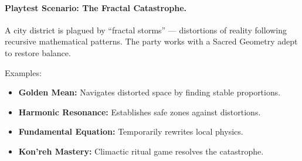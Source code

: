 \paragraph{Playtest Scenario: The Fractal Catastrophe.}  
A city district is plagued by ``fractal storms'' --- distortions of reality following recursive mathematical patterns. The party works with a Sacred Geometry adept to restore balance.  

Examples:  
\begin{itemize}
  \item \textbf{Golden Mean:} Navigates distorted space by finding stable proportions.  
  \item \textbf{Harmonic Resonance:} Establishes safe zones against distortions.  
  \item \textbf{Fundamental Equation:} Temporarily rewrites local physics.  
  \item \textbf{Kon'reh Mastery:} Climactic ritual game resolves the catastrophe.  
\end{itemize}
